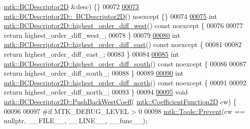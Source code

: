 \begin{DoxyCode}
      \hyperlink{classmtk_1_1BCDescriptor2D}{mtk::BCDescriptor2D} &desc) \{\}
00072 
\hypertarget{mtk__bc__descriptor__2d_8cc_source_l00073}{}\hyperlink{classmtk_1_1BCDescriptor2D_ae14e62548a8bc080d576fff6937c546b}{00073} \hyperlink{classmtk_1_1BCDescriptor2D_ae14e62548a8bc080d576fff6937c546b}{mtk::BCDescriptor2D::~BCDescriptor2D}() noexcept \{\}
00074 
\hypertarget{mtk__bc__descriptor__2d_8cc_source_l00075}{}\hyperlink{classmtk_1_1BCDescriptor2D_a0fa469ddf6ff76e2858d6d3b76cc8b6f}{00075} \textcolor{keywordtype}{int} \hyperlink{classmtk_1_1BCDescriptor2D_a0fa469ddf6ff76e2858d6d3b76cc8b6f}{mtk::BCDescriptor2D::highest\_order\_diff\_west}() const 
      noexcept \{
00076 
00077   \textcolor{keywordflow}{return} highest\_order\_diff\_west\_;
00078 \}
00079 
\hypertarget{mtk__bc__descriptor__2d_8cc_source_l00080}{}\hyperlink{classmtk_1_1BCDescriptor2D_a5a9b80a2e9e579b05d9f3589d80448b6}{00080} \textcolor{keywordtype}{int} \hyperlink{classmtk_1_1BCDescriptor2D_a5a9b80a2e9e579b05d9f3589d80448b6}{mtk::BCDescriptor2D::highest\_order\_diff\_east}() const 
      noexcept \{
00081 
00082   \textcolor{keywordflow}{return} highest\_order\_diff\_east\_;
00083 \}
00084 
\hypertarget{mtk__bc__descriptor__2d_8cc_source_l00085}{}\hyperlink{classmtk_1_1BCDescriptor2D_a463d909f6014e7f01b33171a06d7b400}{00085} \textcolor{keywordtype}{int} \hyperlink{classmtk_1_1BCDescriptor2D_a463d909f6014e7f01b33171a06d7b400}{mtk::BCDescriptor2D::highest\_order\_diff\_south}() const 
      noexcept \{
00086 
00087   \textcolor{keywordflow}{return} highest\_order\_diff\_south\_;
00088 \}
00089 
\hypertarget{mtk__bc__descriptor__2d_8cc_source_l00090}{}\hyperlink{classmtk_1_1BCDescriptor2D_a87c5f2449247d65ea07784ba2ec61bc7}{00090} \textcolor{keywordtype}{int} \hyperlink{classmtk_1_1BCDescriptor2D_a87c5f2449247d65ea07784ba2ec61bc7}{mtk::BCDescriptor2D::highest\_order\_diff\_north}() const 
      noexcept \{
00091 
00092   \textcolor{keywordflow}{return} highest\_order\_diff\_north\_;
00093 \}
00094 
\hypertarget{mtk__bc__descriptor__2d_8cc_source_l00095}{}\hyperlink{classmtk_1_1BCDescriptor2D_a3da32ba89cfb15032bb1156394bad98c}{00095} \textcolor{keywordtype}{void} \hyperlink{classmtk_1_1BCDescriptor2D_a3da32ba89cfb15032bb1156394bad98c}{mtk::BCDescriptor2D::PushBackWestCoeff}(
      \hyperlink{group__c07-mim__ops_gad9e1c0ace886b0029aefffa5f320e852}{mtk::CoefficientFunction2D} cw) \{
00096 
00097 \textcolor{preprocessor}{  #if MTK\_DEBUG\_LEVEL > 0}
00098   \hyperlink{classmtk_1_1Tools_a332324c6f25e66be9dff48c5987a3b9f}{mtk::Tools::Prevent}(cw == \textcolor{keyword}{nullptr}, \_\_FILE\_\_, \_\_LINE\_\_, \_\_func\_\_);

\end{DoxyCode}
